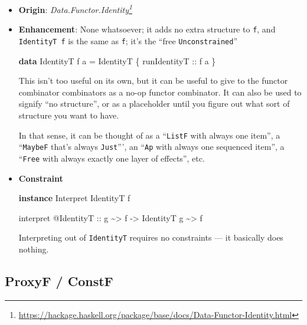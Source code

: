 \documentclass[]{article}
\newenvironment{Shaded}{}{}
\newcommand{\DataTypeTok}[1]{\textcolor[rgb]{0.56,0.13,0.00}{#1}}
\newcommand{\KeywordTok}[1]{\textcolor[rgb]{0.00,0.44,0.13}{\textbf{#1}}}
\newcommand{\NormalTok}[1]{#1}
\newcommand{\OperatorTok}[1]{\textcolor[rgb]{0.40,0.40,0.40}{#1}}
\newcommand{\OtherTok}[1]{\textcolor[rgb]{0.00,0.44,0.13}{#1}}
\renewcommand{\href}[2]{#2\footnote{\url{#1}}}
\begin{document}
\begin{itemize}
\item
  \textbf{Origin}:
  \emph{\href{https://hackage.haskell.org/package/base/docs/Data-Functor-Identity.html}{Data.Functor.Identity}}
\item
  \textbf{Enhancement}: None whatsoever; it adds no extra structure to
  \texttt{f}, and \texttt{IdentityT\ f} is the same as \texttt{f}; it's the
  ``free \texttt{Unconstrained}''

\begin{Shaded}
\begin{Highlighting}[]
\KeywordTok{data} \DataTypeTok{IdentityT}\NormalTok{ f a }\OtherTok{=} \DataTypeTok{IdentityT}\NormalTok{ \{}\OtherTok{ runIdentityT ::}\NormalTok{ f a \}}
\end{Highlighting}
\end{Shaded}

  This isn't too useful on its own, but it can be useful to give to the functor
  combinator combinators as a no-op functor combinator. It can also be used to
  signify ``no structure'', or as a placeholder until you figure out what sort
  of structure you want to have.

  In that sense, it can be thought of as a ``\texttt{ListF} with always one
  item'', a ``\texttt{MaybeF} that's always \texttt{Just}''', an ``\texttt{Ap}
  with always one sequenced item'', a ``\texttt{Free} with always exactly one
  layer of effects'', etc.
\item
  \textbf{Constraint}

\begin{Shaded}
\begin{Highlighting}[]
\KeywordTok{instance} \DataTypeTok{Interpret} \DataTypeTok{IdentityT}\NormalTok{ f}

\NormalTok{interpret }\OperatorTok{@}\DataTypeTok{IdentityT}
\OtherTok{    ::}\NormalTok{ g }\OperatorTok{\textasciitilde{}>}\NormalTok{ f}
    \OtherTok{{-}>} \DataTypeTok{IdentityT}\NormalTok{ g }\OperatorTok{\textasciitilde{}>}\NormalTok{ f}
\end{Highlighting}
\end{Shaded}

  Interpreting out of \texttt{IdentityT} requires no constraints --- it
  basically does nothing.
\end{itemize}

\hypertarget{proxyf-constf}{%
\subsection{ProxyF / ConstF}\label{proxyf-constf}}
\end{document}
